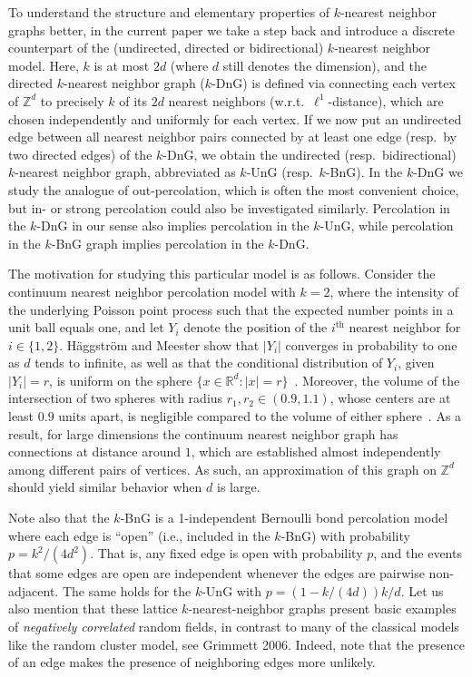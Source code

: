 \documentclass{article}
\theoremstyle{definition}
\newcommand{\1}{\mathbbm{1}}
\newcommand{\0}{\mathbf{o}}
\newcommand{\R}{\mathbb{R}}
\newcommand{\Z}{\mathbb{Z}}
\begin{document}
To understand the structure and elementary properties of $k$-nearest neighbor graphs better, in the current paper we take a step back and introduce a discrete counterpart of the (undirected, directed or bidirectional) $k$-nearest neighbor model. Here, $k$ is at most $2d$ (where $d$ still denotes the dimension), and the directed  $k$-nearest neighbor graph ($k$-DnG) is defined via connecting each vertex of $\Z^d$ to precisely $k$ of its $2d$ nearest neighbors (w.r.t.\ $\ell^1$-distance), which are chosen independently and uniformly for each vertex. If we now put an undirected edge between all nearest neighbor pairs connected by at least one edge (resp.\ by two directed edges) of the $k$-DnG, we obtain the undirected (resp.\ bidirectional) $k$-nearest neighbor graph, abbreviated as $k$-UnG (resp.\ $k$-BnG). In the $k$-DnG we study the analogue of out-percolation, which is often the most convenient choice, but in- or strong percolation could also be investigated similarly. Percolation in the $k$-DnG in our sense also implies percolation in the $k$-UnG, while percolation in the $k$-BnG graph implies percolation in the $k$-DnG. 

The motivation for studying this particular model is as follows. Consider the continuum nearest neighbor percolation model with $k=2$, where the intensity of the underlying Poisson point process such that the expected number points in a unit ball equals one, and let $Y_i$ denote the position of the $i^{\text{th}}$ nearest neighbor for $i\in\{1,2\}$. H\"aggström and Meester show that $|Y_i|$ converges in probability to one as $d$ tends to infinite, as well as that the conditional distribution of $Y_i$, given $|Y_i|=r$, is uniform on the sphere $\{x\in \R^d: |x|=r\}$~\cite[Lemma $3.2$]{HaggMee96}. Moreover, the volume of the intersection of two spheres with radius $r_1,r_2\in(0.9,1.1)$, whose centers are at least $0.9$ units apart, is negligible compared to the volume of either sphere~\cite[Lemma $3.3$]{HaggMee96}. As a result, for large dimensions the continuum nearest neighbor graph has connections at distance around $1$, which are established almost independently among different pairs of vertices. As such, an approximation of this graph on $\Z^d$ should yield similar behavior when $d$ is large. 

Note also that the $k$-BnG is a 1-independent Bernoulli bond percolation model where each edge is ``open'' (i.e., included in the $k$-BnG) with probability $p=k^2/(4d^2)$. That is, any fixed edge is open with probability $p$, and the events that some edges are open are independent whenever the edges are pairwise non-adjacent. The same holds for the $k$-UnG with $p=(1-k/(4d))k/d$. Let us also mention that these lattice $k$-nearest-neighbor graphs present basic examples of {\em negatively correlated} random fields, in contrast to many of the classical models like the random cluster model, see \color{red}Grimmett 2006\color{black}. Indeed, note that the presence of an edge makes the presence of neighboring edges more unlikely. 
\end{document}
